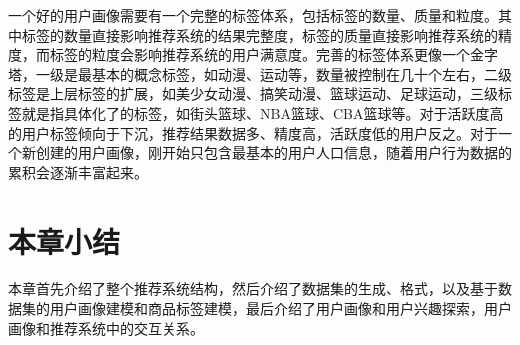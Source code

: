   一个好的用户画像需要有一个完整的标签体系，包括标签的数量、质量和粒度。其中标签的数量直接影响推荐系统的结果完整度，标签的质量直接影响推荐系统的精度，而标签的粒度会影响推荐系统的用户满意度。完善的标签体系更像一个金字塔，一级是最基本的概念标签，如动漫、运动等，数量被控制在几十个左右，二级标签是上层标签的扩展，如美少女动漫、搞笑动漫、篮球运动、足球运动，三级标签就是指具体化了的标签，如街头篮球、NBA篮球、CBA篮球等。对于活跃度高的用户标签倾向于下沉，推荐结果数据多、精度高，活跃度低的用户反之。对于一个新创建的用户画像，刚开始只包含最基本的用户人口信息，随着用户行为数据的累积会逐渐丰富起来。

  \section{本章小结}
  本章首先介绍了整个推荐系统结构，然后介绍了数据集的生成、格式，以及基于数据集的用户画像建模和商品标签建模，最后介绍了用户画像和用户兴趣探索，用户画像和推荐系统中的交互关系。